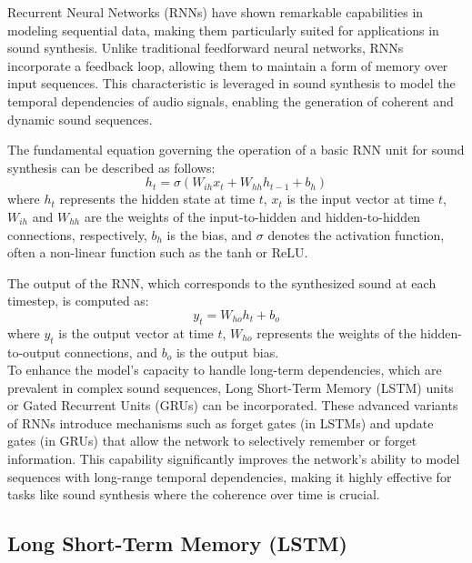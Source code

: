 \documentclass[11pt,a4paper,oneside]{report}
\begin{document}
Recurrent Neural Networks (RNNs) \cite{srivastava2015unsupervised, chiappa2017recurrent, ha2018world} have shown remarkable capabilities in modeling sequential data, making them particularly suited for applications in sound synthesis. 
Unlike traditional feedforward neural networks, RNNs incorporate a feedback loop, allowing them to maintain a form of memory over input sequences. 
This characteristic is leveraged in sound synthesis to model the temporal dependencies of audio signals, enabling the generation of coherent and dynamic sound sequences.

The fundamental equation governing the operation of a basic RNN unit for sound synthesis can be described as follows:
\begin{equation}
h_t = \sigma(W_{ih} x_t + W_{hh} h_{t-1} + b_h)
\end{equation}
where $h_t$ represents the hidden state at time $t$, $x_t$ is the input vector at time $t$, $W_{ih}$ and $W_{hh}$ are the weights of the input-to-hidden and hidden-to-hidden connections, respectively, $b_h$ is the bias, and $\sigma$ denotes the activation function, often a non-linear function such as the tanh or ReLU.

The output of the RNN, which corresponds to the synthesized sound at each timestep, is computed as:
\begin{equation}
y_t = W_{ho} h_t + b_o
\end{equation}
where $y_t$ is the output vector at time $t$, $W_{ho}$ represents the weights of the hidden-to-output connections, and $b_o$ is the output bias. \\
To enhance the model's capacity to handle long-term dependencies, which are prevalent in complex sound sequences, Long Short-Term Memory (LSTM) \cite{yu2019review} units or Gated Recurrent Units (GRUs) \cite{dey2017gate} can be incorporated. 
These advanced variants of RNNs introduce mechanisms such as forget gates (in LSTMs) and update gates (in GRUs) that allow the network to selectively remember or forget information. 
This capability significantly improves the network's ability to model sequences with long-range temporal dependencies, making it highly effective for tasks like sound synthesis where the coherence over time is crucial.

\subsection{Long Short-Term Memory (LSTM)}
\end{document}
